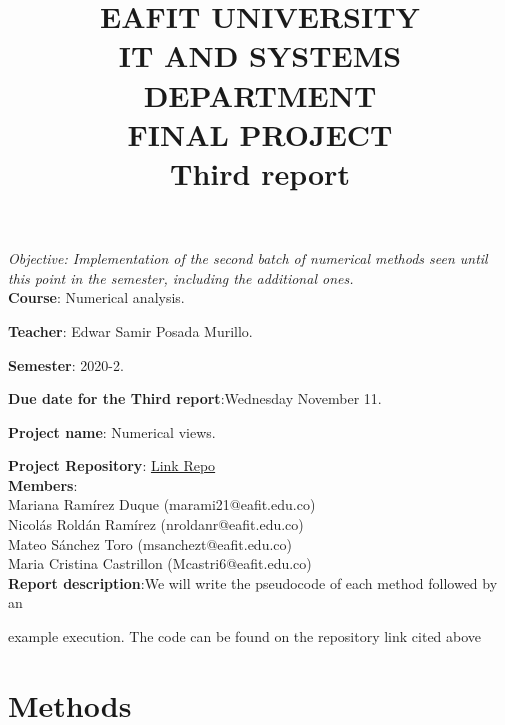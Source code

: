 \documentclass[letterpaper,12pt]{article}
\begin{document}
\title{EAFIT UNIVERSITY\\

IT AND SYSTEMS DEPARTMENT \\

FINAL PROJECT \\


Third report
\date{}
}

\maketitle


\textit{Objective: Implementation of the second batch of numerical methods seen until this point in the semester, including the additional ones.}\\

\textbf{Course}: Numerical analysis.

\textbf{Teacher}: Edwar Samir Posada Murillo.

\textbf{Semester}: 2020-2.

\textbf{Due date for the Third report}:Wednesday November 11.

\textbf{Project name}: Numerical views.

\textbf{Project Repository}: \href{https://github.com/Sanchezt99/NumericalViews}{Link Repo} \\

\textbf{Members}:\\

Mariana Ramírez Duque (marami21@eafit.edu.co) \\

Nicolás Roldán Ramírez (nroldanr@eafit.edu.co) \\

Mateo Sánchez Toro (msanchezt@eafit.edu.co)\\

Maria Cristina Castrillon (Mcastri6@eafit.edu.co) \\


\textbf{Report description}:We will write the pseudocode of each method followed by an


example execution. The code can be found on the repository link cited above

\clearpage
\section{Methods}
\end{document}
